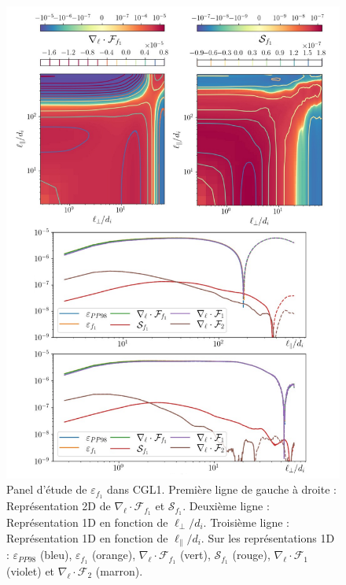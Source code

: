 \begin{figure}[!ht]
 \centering
\includegraphics[width=0.9\linewidth,trim=0cm 0cm 0cm 0cm, clip=true]{./Part_3/images_ch2/CGL1_f1}
\cprotect\caption{Panel d'étude de $\varepsilon_{f_1}$ dans CGL1. Première ligne de gauche à droite : Représentation 2D de $\nabla_{\boldsymbol{\ell}} \cdot \mathcal{F}_{f_1}$  et $\mathcal{S}_{f_1}$. Deuxième ligne : Représentation 1D en fonction de $\ell_{\perp}/d_i$. Troisième ligne : Représentation 1D en fonction de $\ell_{\parallel}/d_i$. Sur les représentations 1D : $\varepsilon_{PP98}$ (bleu), $\varepsilon_{f_1}$ (orange), $\nabla_{\boldsymbol{\ell}} \cdot \mathcal{F}_{f_1}$ (vert), $\mathcal{S}_{f_1}$ (rouge),  $\nabla_{\boldsymbol{\ell}} \cdot \mathcal{F}_1$ (violet)  et $\nabla_{\boldsymbol{\ell}} \cdot \mathcal{F}_2$ (marron).}
\label{fig:elf1_CGL1}
\end{figure}

